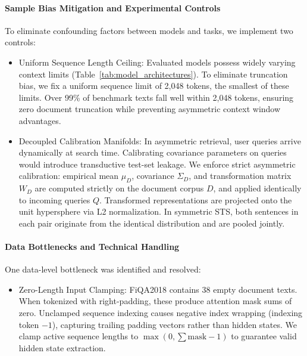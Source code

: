 \paragraph{Sample Bias Mitigation and Experimental Controls}
To eliminate confounding factors between models and tasks, we implement two controls:
\begin{itemize}
\item Uniform Sequence Length Ceiling: Evaluated models possess widely varying context limits (Table~\ref{tab:model_architectures}). To eliminate truncation bias, we fix a uniform sequence limit of 2,048 tokens, the smallest of these limits. Over 99\% of benchmark texts fall well within 2,048 tokens, ensuring zero document truncation while preventing asymmetric context window advantages.
\item Decoupled Calibration Manifolds: In asymmetric retrieval, user queries arrive dynamically at search time. Calibrating covariance parameters on queries would introduce transductive test-set leakage. We enforce strict asymmetric calibration: empirical mean $\mu_D$, covariance $\Sigma_D$, and transformation matrix $W_D$ are computed strictly on the document corpus $D$, and applied identically to incoming queries $Q$. Transformed representations are projected onto the unit hypersphere via L2 normalization. In symmetric STS, both sentences in each pair originate from the identical distribution and are pooled jointly.
\end{itemize}

\paragraph{Data Bottlenecks and Technical Handling}
One data-level bottleneck was identified and resolved:
\begin{itemize}
\item Zero-Length Input Clamping: FiQA2018 contains 38 empty document texts. When tokenized with right-padding, these produce attention mask sums of zero. Unclamped sequence indexing causes negative index wrapping (indexing token $-1$), capturing trailing padding vectors rather than hidden states. We clamp active sequence lengths to $\max(0, \sum \text{mask} - 1)$ to guarantee valid hidden state extraction.
\end{itemize}
